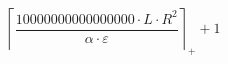 \[\left\lceil \frac{10000000000000000 \cdot L \cdot R^{2}}{\alpha \cdot \varepsilon} \right\rceil_{+} + 1\]
